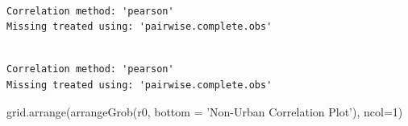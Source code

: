 \documentclass[]{article}
\newenvironment{Shaded}{}{}
\newcommand{\DataTypeTok}[1]{#1}
\newcommand{\DecValTok}[1]{#1}
\newcommand{\KeywordTok}[1]{\textcolor[rgb]{0.00,0.00,1.00}{#1}}
\newcommand{\NormalTok}[1]{#1}
\newcommand{\OperatorTok}[1]{#1}
\newcommand{\StringTok}[1]{\textcolor[rgb]{0.00,0.50,0.50}{#1}}
\begin{document}
\begin{verbatim}

Correlation method: 'pearson'
Missing treated using: 'pairwise.complete.obs'
\end{verbatim}

\begin{Shaded}
\end{Shaded}

\begin{verbatim}

Correlation method: 'pearson'
Missing treated using: 'pairwise.complete.obs'
\end{verbatim}

\begin{Shaded}
\begin{Highlighting}[]
\KeywordTok{grid.arrange}\NormalTok{(}\KeywordTok{arrangeGrob}\NormalTok{(r0, }\DataTypeTok{bottom =} \StringTok{'Non-Urban Correlation Plot'}\NormalTok{), }\DataTypeTok{ncol=}\DecValTok{1}\NormalTok{)}
\end{Highlighting}
\end{Shaded}
\end{document}
